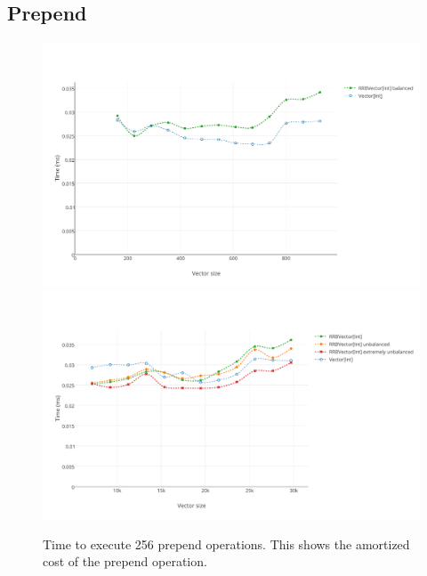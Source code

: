 \subsection{Prepend}

\begin{figure}[h!]
  \centering
  \includegraphics[width=\textwidth]{Benchmarks/Prepend_2.pdf}
  \includegraphics[width=\textwidth]{Benchmarks/Prepend_3.pdf}
  \label{PrependBenchmarks}
  \caption{Time to execute 256 prepend operations. This shows the amortized cost of the prepend operation.}
\end{figure}


